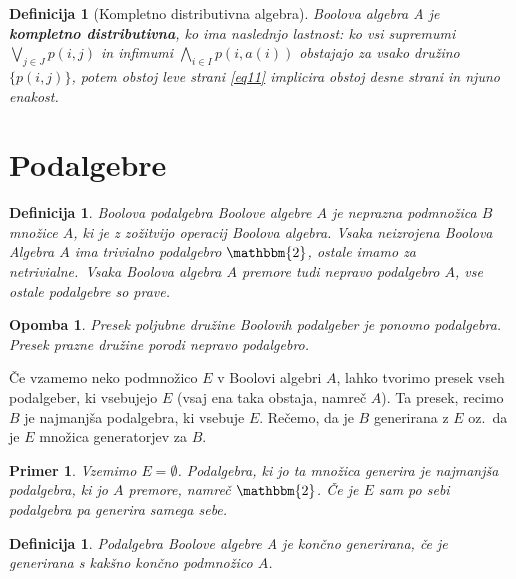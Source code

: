 \documentclass{amsart}
\newtheorem{definicija}[izrek]{Definicija}
\newtheorem{opomba}[izrek]{Opomba}
\newtheorem{primer}[izrek]{Primer}
\begin{document}
\begin{definicija}[Kompletno distributivna algebra]
    Boolova algebra A je {\bf kompletno distributivna}, ko ima naslednjo lastnost:
    ko vsi supremumi \(\bigvee_{j \in J} p(i, j)\) in infimumi \(\bigwedge_{i \in I} p(i, a(i))\) obstajajo za vsako družino
    \(\{p(i, j)\}\), potem obstoj leve strani \eqref{eq11} implicira obstoj desne strani in njuno enakost.
\end{definicija}



\section{Podalgebre}

\begin{definicija}
    Boolova podalgebra Boolove algebre $A$ je neprazna podmnožica $B$ množice $A$, ki je z zožitvijo operacij Boolova algebra.
    Vsaka neizrojena Boolova Algebra $A$ ima trivialno podalgebro $\mathbbm{2}$, ostale imamo za netrivialne.\
    Vsaka Boolova algebra $A$ premore tudi nepravo podalgebro $A$, vse ostale podalgebre so prave.
\end{definicija}

\begin{opomba}
    Presek poljubne družine Boolovih podalgeber je ponovno podalgebra. Presek prazne družine porodi nepravo podalgebro.
\end{opomba}

Če vzamemo neko podmnožico \(E\) v Boolovi algebri \(A\), lahko tvorimo presek vseh podalgeber, ki vsebujejo $E$ (vsaj ena taka obstaja, namreč $A$).
Ta presek, recimo $B$ je najmanjša podalgebra, ki vsebuje $E$. Rečemo, da je $B$ generirana z $E$ oz.\ da je $E$ množica generatorjev za $B$.

\begin{primer}
    Vzemimo \(E = \emptyset\). Podalgebra, ki jo ta množica generira je najmanjša podalgebra, ki jo $A$ premore, namreč $\mathbbm{2}$. Če je $E$ sam po sebi podalgebra pa generira samega sebe.
\end{primer}

\begin{definicija}
    Podalgebra Boolove algebre A je končno generirana, če je generirana s kakšno končno podmnožico $A$.
\end{definicija}
\end{document}
